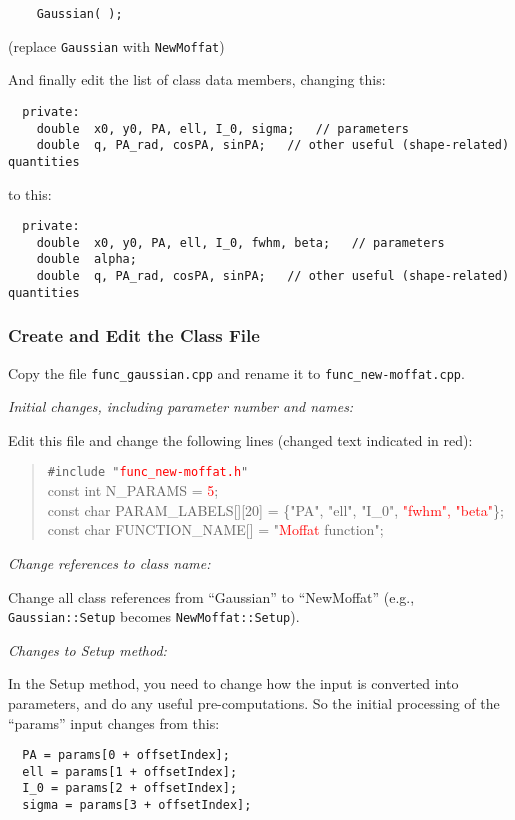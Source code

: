 \documentclass[10pt,a4paper,article]{memoir}
\newcommand{\red}{\textcolor{red}}
\begin{document}
\begin{verbatim}
    Gaussian( );
\end{verbatim}
(replace \texttt{Gaussian} with \texttt{NewMoffat})

And finally edit the list of class data members, changing this:
\begin{verbatim}
  private:
    double  x0, y0, PA, ell, I_0, sigma;   // parameters
    double  q, PA_rad, cosPA, sinPA;   // other useful (shape-related) quantities
\end{verbatim}
to this:
\begin{verbatim}
  private:
    double  x0, y0, PA, ell, I_0, fwhm, beta;   // parameters
    double  alpha;
    double  q, PA_rad, cosPA, sinPA;   // other useful (shape-related) quantities
\end{verbatim}


\subsubsection{Create and Edit the Class File}

Copy the file \texttt{func\_gaussian.cpp} and rename it to \texttt{func\_new-moffat.cpp}. 

\bigskip
\noindent \textit{Initial changes, including parameter number and names:}
\smallskip

Edit this file and change the following lines (changed text indicated in red):

\begin{quote}
\texttt{\#include "\red{func\_new-moffat.h}"} \\

const int  N\_PARAMS = \red{5}; \\

const char  PARAM\_LABELS[][20] = \{"PA", "ell", "I\_0", \red{"fwhm", "beta"}\}; \\

const char  FUNCTION\_NAME[] = "\red{Moffat} function";

\end{quote}

\bigskip
\noindent \textit{Change references to class name:}
\smallskip

Change all class references from ``Gaussian'' to ``NewMoffat'' (e.g., \texttt{Gaussian::Setup}
becomes \texttt{NewMoffat::Setup}).

\bigskip
\noindent \textit{Changes to Setup method:}
\smallskip

In the Setup method, you need to change how the input is converted into
parameters, and do any useful pre-computations. So the initial processing of
the ``params'' input changes from this:
\begin{verbatim}
  PA = params[0 + offsetIndex];
  ell = params[1 + offsetIndex];
  I_0 = params[2 + offsetIndex];
  sigma = params[3 + offsetIndex];
\end{verbatim}
\end{document}
